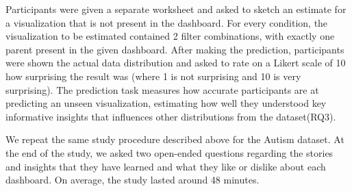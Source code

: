  Participants were given a separate worksheet and asked to sketch an estimate for a visualization that is not present in the dashboard. For every condition, the visualization to be estimated contained 2 filter combinations, with exactly one parent present in the given dashboard. After making the prediction, participants were shown the actual data distribution and asked to rate on a Likert scale of 10 how surprising the result was (where 1 is not surprising and 10 is very surprising). The prediction task measures how accurate participants are at predicting an unseen visualization, estimating how well they understood key informative insights that influences other distributions from the dataset(RQ3).
\par We repeat the same study procedure described above for the Autism dataset. At the end of the study, we asked two open-ended questions regarding the stories and insights that they have learned and what they like or dislike about each dashboard. On average, the study lasted around 48 minutes.
